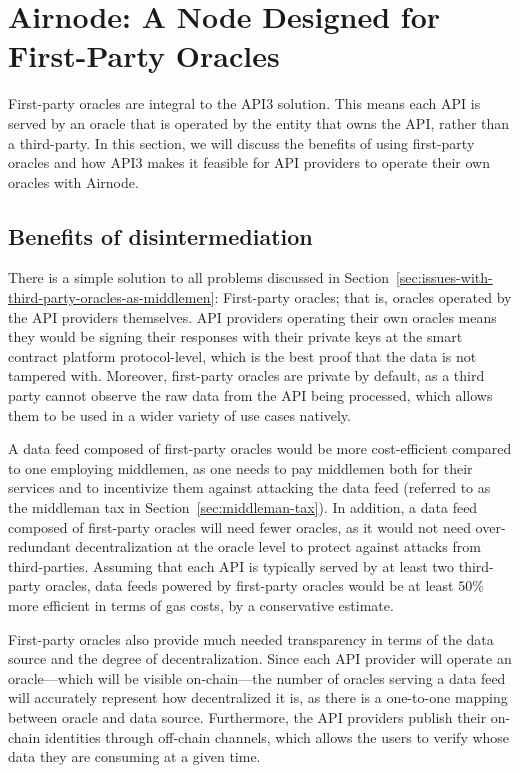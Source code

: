 \documentclass[11pt]{article}
\begin{document}
\section{Airnode: A Node Designed for First-Party Oracles}
\label{sec:airnode-a-node-designed-for-first-party-oracles}

First-party oracles are integral to the API3 solution.
This means each API is served by an oracle that is operated by the entity that owns the API, rather than a third-party.
In this section, we will discuss the benefits of using first-party oracles and how API3 makes it feasible for API providers to operate their own oracles with Airnode.

\subsection{Benefits of disintermediation}
\label{sec:benefits-of-disintermediation}

There is a simple solution to all problems discussed in Section~\ref{sec:issues-with-third-party-oracles-as-middlemen}: First-party oracles; that is, oracles operated by the API providers themselves.
API providers operating their own oracles means they would be signing their responses with their private keys at the smart contract platform protocol-level, which is the best proof that the data is not tampered with.
Moreover, first-party oracles are private by default, as a third party cannot observe the raw data from the API being processed, which allows them to be used in a wider variety of use cases natively.

A data feed composed of first-party oracles would be more cost-efficient compared to one employing middlemen, as one needs to pay middlemen both for their services and to incentivize them against attacking the data feed (referred to as the middleman tax in Section~\ref{sec:middleman-tax}).
In addition, a data feed composed of first-party oracles will need fewer oracles, as it would not need over-redundant decentralization at the oracle level to protect against attacks from third-parties.
Assuming that each API is typically served by at least two third-party oracles, data feeds powered by first-party oracles would be at least $50\%$ more efficient in terms of gas costs, by a conservative estimate.

First-party oracles also provide much needed transparency in terms of the data source and the degree of decentralization.
Since each API provider will operate an oracle---which will be visible on-chain---the number of oracles serving a data feed will accurately represent how decentralized it is, as there is a one-to-one mapping between oracle and data source.
Furthermore, the API providers publish their on-chain identities through off-chain channels, which allows the users to verify whose data they are consuming at a given time.
\end{document}
